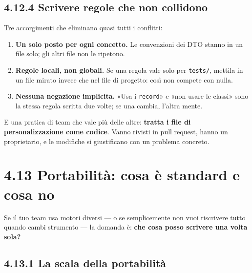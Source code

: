 \documentclass[
  italian,
  10pt,
]{book}
\providecommand{\tightlist}{%
  \setlength{\itemsep}{0pt}\setlength{\parskip}{0pt}}
\begin{document}
\subsection{4.12.4 Scrivere regole che non
collidono}\label{scrivere-regole-che-non-collidono}

Tre accorgimenti che eliminano quasi tutti i conflitti:

\begin{enumerate}
\def\labelenumi{\arabic{enumi}.}
\tightlist
\item
  \textbf{Un solo posto per ogni concetto.} Le convenzioni dei DTO
  stanno in un file solo; gli altri file non le ripetono.
\item
  \textbf{Regole locali, non globali.} Se una regola vale solo per
  \texttt{tests/}, mettila in un file mirato invece che nel file di
  progetto: così non compete con nulla.
\item
  \textbf{Nessuna negazione implicita.} «Usa i \texttt{record}» e «non
  usare le classi» sono la stessa regola scritta due volte; se una
  cambia, l'altra mente.
\end{enumerate}

E una pratica di team che vale più delle altre: \textbf{tratta i file di
personalizzazione come codice}. Vanno rivisti in pull request, hanno un
proprietario, e le modifiche si giustificano con un problema concreto.

\section{4.13 Portabilità: cosa è standard e cosa
no}\label{portabilituxe0-cosa-uxe8-standard-e-cosa-no}

Se il tuo team usa motori diversi --- o se semplicemente non vuoi
riscrivere tutto quando cambi strumento --- la domanda è: \textbf{che
cosa posso scrivere una volta sola?}

\subsection{4.13.1 La scala della
portabilità}\label{la-scala-della-portabilituxe0}
\end{document}
